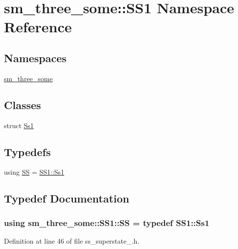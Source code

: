 \hypertarget{namespacesm__three__some_1_1SS1}{}\section{sm\+\_\+three\+\_\+some\+:\+:S\+S1 Namespace Reference}
\label{namespacesm__three__some_1_1SS1}
\subsection*{Namespaces}
\begin{DoxyCompactItemize}
\item 
 \hyperlink{namespacesm__three__some_1_1SS1_1_1sm__three__some}{sm\+\_\+three\+\_\+some}
\end{DoxyCompactItemize}
\subsection*{Classes}
\begin{DoxyCompactItemize}
\item 
struct \hyperlink{structsm__three__some_1_1SS1_1_1Ss1}{Ss1}
\end{DoxyCompactItemize}
\subsection*{Typedefs}
\begin{DoxyCompactItemize}
\item 
using \hyperlink{namespacesm__three__some_1_1SS1_ac4d8073976f20771e5e3e2320b19014f}{SS} = \hyperlink{structsm__three__some_1_1SS1_1_1Ss1}{S\+S1\+::\+Ss1}
\end{DoxyCompactItemize}


\subsection{Typedef Documentation}
\subsubsection[{\texorpdfstring{SS}{SS}}]{\setlength{\rightskip}{0pt plus 5cm}using {\bf sm\+\_\+three\+\_\+some\+::\+S\+S1\+::\+SS} = typedef {\bf S\+S1\+::\+Ss1}}\hypertarget{namespacesm__three__some_1_1SS1_ac4d8073976f20771e5e3e2320b19014f}{}\label{namespacesm__three__some_1_1SS1_ac4d8073976f20771e5e3e2320b19014f}


Definition at line 46 of file ss\+\_\+superstate\+\_.\+h.

